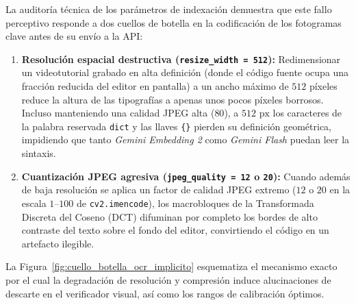 La auditoría técnica de los parámetros de indexación demuestra que este fallo perceptivo responde a dos cuellos de botella en la codificación de los fotogramas clave antes de su envío a la API: %
\begin{enumerate}
    \item \textbf{Resolución espacial destructiva (\texttt{resize\_width = 512}):} Redimensionar un videotutorial grabado en alta definición (donde el código fuente ocupa una fracción reducida del editor en pantalla) a un ancho máximo de $512$ píxeles reduce la altura de las tipografías a apenas unos pocos píxeles borrosos. %
    Incluso manteniendo una calidad JPEG alta ($80$), a $512\text{ px}$ los caracteres de la palabra reservada \texttt{dict} y las llaves \texttt{\{\}} pierden su definición geométrica, impidiendo que tanto \textit{Gemini Embedding 2} como \textit{Gemini Flash} puedan leer la sintaxis. %
    \item \textbf{Cuantización JPEG agresiva (\texttt{jpeg\_quality = 12} o \texttt{20}):} Cuando además de baja resolución se aplica un factor de calidad JPEG extremo ($12$ o $20$ en la escala $1\text{--}100$ de \texttt{cv2.imencode}), los macrobloques de la Transformada Discreta del Coseno (DCT) difuminan por completo los bordes de alto contraste del texto sobre el fondo del editor, convirtiendo el código en un artefacto ilegible. %
\end{enumerate}

La Figura~\ref{fig:cuello_botella_ocr_implicito} esquematiza el mecanismo exacto por el cual la degradación de resolución y compresión induce alucinaciones de descarte en el verificador visual, así como los rangos de calibración óptimos. %

